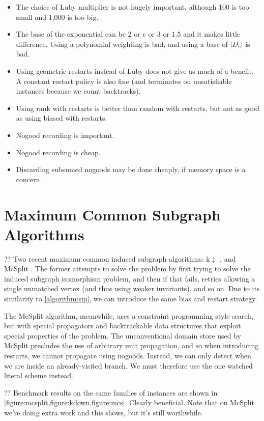 \documentclass{article}
\newcommand{\citep}[1]{\cite{#1}}
\begin{document}
\begin{itemize}
    \item The choice of Luby multiplier is not hugely important, although 100 is too small and 1,000
        is too big.
    \item The base of the exponential can be $2$ or $e$ or $3$ or $1.5$ and it makes little
        difference. Using a polynomial weighting is bad, and using a base of $|D_v|$ is bad.
    \item Using geometric restarts instead of Luby does not give as much of a benefit. A constant
        restart policy is also fine (and terminates on unsatisfiable instances because we count
        backtracks).
    \item Using rank with restarts is better than random with restarts, but not as good as using
        biased with restarts.
    \item Nogood recording is important.
    \item Nogood recording is cheap.
    \item Discarding subsumed nogoods may be done cheaply, if memory space is a concern.
\end{itemize}

\section{Maximum Common Subgraph Algorithms}

?? Two recent maximum common induced subgraph algorithms: k${\downarrow}$
\citep{DBLP:conf/aaai/HoffmannMR17}, and McSplit \citep{DBLP:conf/ijcai/McCreeshPT17}. The former
attempts to solve the problem by first trying to solve the induced subgraph isomorphism problem, and
then if that fails, retries allowing a single unmatched vertex (and thus using weaker invariants),
and so on. Due to its similarity to \cref{algorithm:sip}, we can introduce the same bias and restart
strategy.

The McSplit algorithm, meanwhile, uses a constraint programming style search, but with special
propagators and backtrackable data structures that exploit special properties of the problem. The
unconventional domain store used by McSplit precludes the use of arbitrary unit propagation, and so
when introducing restarts, we cannot propagate using nogoods. Instead, we can only detect when we
are inside an already-visited branch. We must therefore use the one watched literal scheme instead.

?? Benchmark results on the same families of instances are shown in
\cref{figure:mcsplit,figure:kdown,figure:mcs}. Clearly beneficial. Note that on McSplit we're doing
extra work and this shows, but it's still worthwhile.
\end{document}
